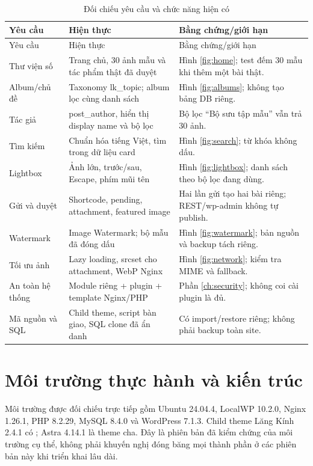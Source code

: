 \begin{longtable}{P{3.5cm}P{6.1cm}P{4.9cm}}
\caption{Đối chiếu yêu cầu và chức năng hiện có}\label{tab:requirements}\\\toprule Yêu cầu & Hiện thực & Bằng chứng/giới hạn\\\midrule\endfirsthead
\toprule Yêu cầu & Hiện thực & Bằng chứng/giới hạn\\\midrule\endhead
Thư viện số & Trang chủ, 30 ảnh mẫu và tác phẩm thật đã duyệt & Hình \ref{fig:home}; test đếm 30 mẫu khi thêm một bài thật.\\
Album/chủ đề & Taxonomy lk\_topic; album lọc cùng danh sách & Hình \ref{fig:albums}; không tạo bảng DB riêng.\\
Tác giả & post\_author, hiển thị display name và bộ lọc & Bộ lọc ``Bộ sưu tập mẫu'' vẫn trả 30 ảnh.\\
Tìm kiếm & Chuẩn hóa tiếng Việt, tìm trong dữ liệu card & Hình \ref{fig:search}; từ khóa không dấu.\\
Lightbox & Ảnh lớn, trước/sau, Escape, phím mũi tên & Hình \ref{fig:lightbox}; danh sách theo bộ lọc đang dùng.\\
Gửi và duyệt & Shortcode, pending, attachment, featured image & Hai lần gửi tạo hai bài riêng; REST/wp-admin không tự publish.\\
Watermark & Image Watermark; bộ mẫu đã đóng dấu & Hình \ref{fig:watermark}; bản nguồn và backup tách riêng.\\
Tối ưu ảnh & Lazy loading, srcset cho attachment, WebP Nginx & Hình \ref{fig:network}; kiểm tra MIME và fallback.\\
An toàn hệ thống & Module riêng + plugin + template Nginx/PHP & Phần \ref{ch:security}; không coi cài plugin là đủ.\\
Mã nguồn và SQL & Child theme, script bàn giao, SQL clone đã ẩn danh & Có import/restore riêng; không phải backup toàn site.\\\bottomrule
\end{longtable}

\section{Môi trường thực hành và kiến trúc}
Môi trường được đối chiếu trực tiếp gồm Ubuntu 24.04.4, LocalWP 10.2.0, Nginx 1.26.1, PHP 8.2.29, MySQL 8.4.0 và WordPress 7.1.3. Child theme Lăng Kính 2.4.1 có ; Astra 4.14.1 là theme cha. Đây là phiên bản đã kiểm chứng của môi trường cụ thể, không phải khuyến nghị đóng băng mọi thành phần ở các phiên bản này khi triển khai lâu dài.


